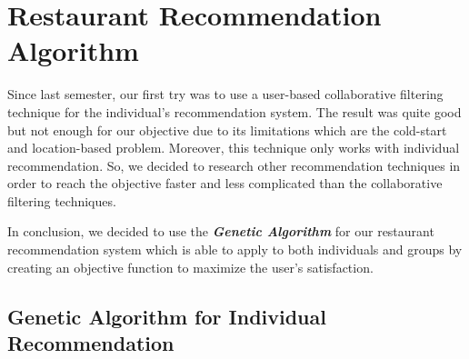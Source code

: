 \documentclass[12pt,oneside,openright,a4paper]{cpe-english-project}
\begin{document}
\section{Restaurant Recommendation Algorithm}

Since last semester, our first try was to use a user-based collaborative filtering technique for the individual’s recommendation system. The result was quite good but not enough for our objective due to its limitations which are the cold-start and location-based problem. Moreover, this technique only works with individual recommendation. So, we decided to research other recommendation techniques in order to reach the objective faster and less complicated than the collaborative filtering techniques.

In conclusion, we decided to use the \textit{\textbf{Genetic Algorithm}} for our restaurant recommendation system which is able to apply to both individuals and groups by creating an objective function to maximize the user’s satisfaction.

\newpage
\subsection{Genetic Algorithm for Individual Recommendation}
\end{document}
